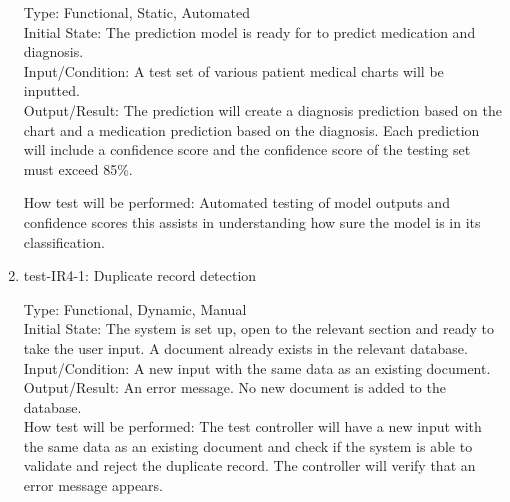 \documentclass[12pt, titlepage]{article}
\begin{document}
\begin{enumerate}
    Type: Functional, Static, Automated\\
    
    Initial State: The prediction model is ready for to predict medication and diagnosis.\\
    
    Input/Condition: A test set of various patient medical charts will be inputted.\\
    
    Output/Result: The prediction will create a diagnosis prediction based on the chart and a medication prediction based on the diagnosis. Each prediction will include a confidence score and the confidence score of the testing set must exceed 85\%.
    
    How test will be performed: Automated testing of model outputs and confidence scores this assists in understanding how sure the model is in its classification.

    \item{test-IR4-1}: Duplicate record detection \label{test-IR4-1}
    
    Type: Functional, Dynamic, Manual\\
    
    Initial State: The system is set up, open to the relevant section and ready to take the user input. A document already exists in the relevant database.\\
    
    Input/Condition: A new input with the same data as an existing document.\\
    
    Output/Result: An error message. No new document is added to the database.\\
    
    How test will be performed: The test controller will have a new input with the same data as an existing document and check if the system is able to validate and reject the duplicate record. The controller will verify that an error message appears.


    
    
    
    

\end{enumerate}
\end{document}
